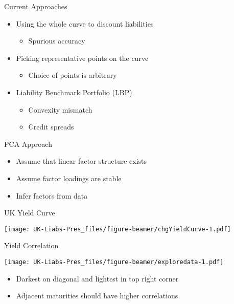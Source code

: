 \documentclass[ignorenonframetext,]{beamer}
\providecommand{\tightlist}{%
  \setlength{\itemsep}{0pt}\setlength{\parskip}{0pt}}
\begin{document}
\begin{frame}{Current Approaches}
\protect\hypertarget{current-approaches}{}

\begin{itemize}
\tightlist
\item
  Using the whole curve to discount liabilities

  \begin{itemize}
  \tightlist
  \item
    Spurious accuracy
  \end{itemize}
\item
  Picking representative points on the curve

  \begin{itemize}
  \tightlist
  \item
    Choice of points is arbitrary
  \end{itemize}
\item
  Liability Benchmark Portfolio (LBP)

  \begin{itemize}
  \tightlist
  \item
    Convexity mismatch
  \item
    Credit spreads
  \end{itemize}
\end{itemize}

\end{frame}

\begin{frame}{PCA Approach}
\protect\hypertarget{pca-approach}{}

\begin{itemize}
\tightlist
\item
  Assume that linear factor structure exists
\item
  Assume factor loadings are stable
\item
  Infer factors from data
\end{itemize}

\end{frame}

\begin{frame}{UK Yield Curve}
\protect\hypertarget{uk-yield-curve}{}

\texttt{[image: UK-Liabs-Pres\_files/figure-beamer/chgYieldCurve-1.pdf]}

\end{frame}

\begin{frame}{Yield Correlation}
\protect\hypertarget{yield-correlation}{}

\texttt{[image: UK-Liabs-Pres\_files/figure-beamer/exploredata-1.pdf]}

\begin{itemize}
\tightlist
\item
  Darkest on diagonal and lightest in top right corner
\item
  Adjacent maturities should have higher correlations
\end{itemize}

\end{frame}
\end{document}
